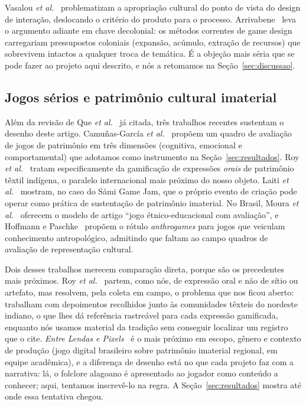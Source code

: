 \documentclass[conference]{IEEEtran}
\begin{document}
Vasalou \textit{et al.}~\cite{vasalou2014} problematizam a apropriação cultural do ponto
de vista do design de interação, deslocando o critério do produto para o processo.
Arrivabene~\cite{arrivabene2025} leva o argumento adiante em chave decolonial: os
métodos correntes de game design carregariam pressupostos coloniais (expansão, acúmulo,
extração de recursos) que sobrevivem intactos a qualquer troca de temática. É a objeção
mais séria que se pode fazer ao projeto aqui descrito, e nós a retomamos na
Seção~\ref{sec:discussao}.

\subsection{Jogos sérios e patrimônio cultural imaterial}

Além da revisão de Que \textit{et al.}~\cite{que2025} já citada, três trabalhos recentes
sustentam o desenho deste artigo. Camuñas-García \textit{et al.}~\cite{camunas2023}
propõem um quadro de avaliação de jogos de patrimônio em três dimensões (cognitiva,
emocional e comportamental) que adotamos como instrumento na Seção~\ref{sec:resultados}.
Roy \textit{et al.}~\cite{roy2024} tratam especificamente da gamificação de expressões
\textit{orais} de patrimônio têxtil indígena, o paralelo internacional mais próximo do
nosso objeto. Laiti \textit{et al.}~\cite{laiti2021} mostram, no caso do Sámi Game Jam,
que o próprio evento de criação pode operar como prática de sustentação de patrimônio
imaterial. No Brasil, Moura
\textit{et al.}~\cite{moura2025} oferecem o modelo de artigo ``jogo étnico-educacional
com avaliação'', e Hoffmann e Paschke~\cite{hoffmann2025} propõem o rótulo
\textit{anthrogames} para jogos que veiculam conhecimento antropológico, admitindo que
faltam ao campo quadros de avaliação de representação cultural.

Dois desses trabalhos merecem comparação direta, porque são os precedentes mais
próximos. Roy \textit{et al.}~\cite{roy2024} partem, como nós, de expressão oral e não
de sítio ou artefato, mas resolvem, pela coleta em campo, o
problema que nos ficou aberto: trabalham com depoimentos recolhidos junto às comunidades
têxteis do nordeste indiano, o que lhes dá referência rastreável para cada expressão
gamificada, enquanto nós usamos material da tradição sem conseguir localizar um registro
que o cite. \textit{Entre Lendas e
Pixels}~\cite{locatelli2025} é o mais próximo em escopo, gênero e contexto de produção
(jogo digital brasileiro sobre patrimônio imaterial regional, em equipe acadêmica), e a
diferença de desenho está no que cada projeto faz com a narrativa: lá, o folclore
alagoano é apresentado ao jogador como conteúdo a conhecer; aqui, tentamos inscrevê-lo
na regra. A Seção~\ref{sec:resultados} mostra até onde essa tentativa chegou.
\end{document}
